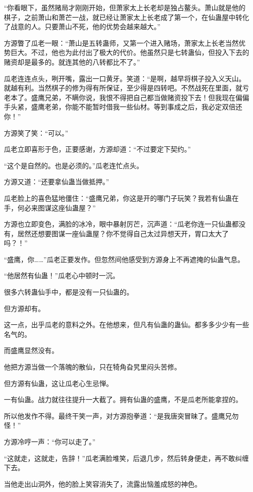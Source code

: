 \begin{this_body}
“你看眼下，虽然赌局才刚刚开始，但萧家太上长老却是独占鳌头。萧山就是他的棋子，之前萧山和萧芒一战，就已经让萧家太上长老成了第一个，在仙蛊屋中转化了战意的人。只要萧山不死，他的优势会越来越大。”

方源瞥了瓜老一眼：“萧山是五转蛊师，又第一个进入赌场，萧家太上长老当然优势巨大。不过，他也为此付出了极大的代价。他虽然只是七转蛊仙，但投入下去的赌资却是最多的。就连其他的八转都比不了。”

瓜老连连点头，咧开嘴，露出一口黄牙。笑道：“是啊，越早将棋子投入义天山。就越有利。当然棋子的修为得有所保证，至少得是四转吧。不然战死在里面，就亏老本了。盛鹰兄弟，不瞒你说，我恨不得把自己都当做赌资投下去！但我现在偏偏手头紧，盛鹰老弟，你能不能暂时借我一些仙材。等到事成之后，我必定双倍还你！”

方源笑了笑：“可以。”

瓜老立即喜形于色，正要感谢，方源却道：“不过要定下契约。”

“这个是自然的。也是必须的。”瓜老连忙点头。

方源又道：“还要拿仙蛊当做抵押。”

瓜老脸上的喜色猛地僵住：“盛鹰兄弟，你这是开的哪门子玩笑？我若有仙蛊在手，何必来图谋这座仙蛊屋？”

方源也立即变色，满脸的冰冷，眼中暴射厉芒，沉声道：“瓜老你连一只仙蛊都没有，居然还想要图谋一座仙蛊屋？你不觉得自己太过异想天开，胃口太大了吗？！”

“盛鹰，你……”瓜老正要发作。但忽然间他感受到方源身上不再遮掩的仙蛊气息。

“他居然有仙蛊！”瓜老心中顿时一沉。

很多六转蛊仙手中，都是没有一只仙蛊的。

但方源却有。

这一点，出乎瓜老的意料之外。在他想来，但凡有仙蛊的蛊仙。都多多少少有一些名气的。

而盛鹰显然没有。

他把方源当做一个落魄的散仙，只在犄角旮旯里闷头苦修。

但方源有仙蛊，这让瓜老心生忌惮。

一有仙蛊。战力就往往提升一大截了。拥有仙蛊的盛鹰，不是瓜老所能拿捏的。

所以他发作不得。最终干笑一声，对方源抱拳道：“是我唐突冒昧了。盛鹰兄勿怪！”

方源冷哼一声：“你可以走了。”

“这就走，这就走，告辞！”瓜老满脸堆笑，后退几步，然后转身便走，再不敢纠缠下去。

当他走出山洞外，他的脸上笑容消失了，流露出恼羞成怒的神色。


\end{this_body}
